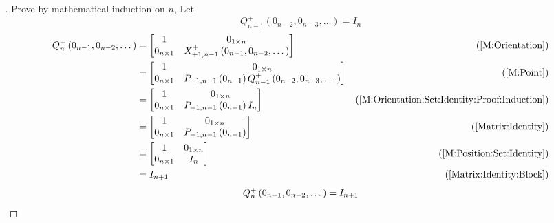 \documentclass[stu, babel, american, biblatex, a4paper, leqno, draftall]{apa7}
\begin{document}
\begin{proof}[]
    Prove by mathematical induction on $n$,
    Let 
    \begin{equation}\label{M:Orientation:Set:Identity:Proof:Induction}
        Q^+_{n-1}\left(0_{n-2}, 0_{n-3}, \dots\right)=I_n
    \end{equation}
	\begin{align*}
		Q^+_n\left(0_{n-1}, 0_{n-2}, \dots\right)
		&=
		\begin{bmatrix}
            1 & 0_{1\times n}                                                             \\
            0_{n\times 1} & X^\pm_{+1,n-1}\left(0_{n-1},0_{n-2},\dots\right) \\
        \end{bmatrix} & \text{(\cref{M:Orientation})} \\
        &=
		\begin{bmatrix}
            1 & 0_{1\times n}                                                             \\
            0_{n\times 1} & P_{+1,n-1}\left(0_{n-1}\right)Q^+_{n-1}\left(0_{n-2}, 0_{n-3}, \dots\right) \\
        \end{bmatrix} & \text{(\cref{M:Point})} \\
        &=
		\begin{bmatrix}
            1 & 0_{1\times n}                                                             \\
            0_{n\times 1} & P_{+1,n-1}\left(0_{n-1}\right) I_n \\
        \end{bmatrix} & \text{(\cref{M:Orientation:Set:Identity:Proof:Induction})} \\
        &=
		\begin{bmatrix}
            1 & 0_{1\times n}                                                             \\
            0_{n\times 1} & P_{+1,n-1}\left(0_{n-1}\right) \\
        \end{bmatrix} & \text{(\cref{Matrix:Identity})} \\
        &=
		\begin{bmatrix}
            1 & 0_{1\times n}                                                             \\
            0_{n\times 1} & I_{n} \\
        \end{bmatrix} & \text{(\cref{M:Position:Set:Identity})} \\
        &=
		I_{n+1} & \text{(\cref{Matrix:Identity:Block})}
	\end{align*}
    \begin{equation*}
    	Q^+_n
        \left(0_{n-1}, 0_{n-2}, \dots\right)
    	=
    	I_{n+1}
    	\qedhere
    \end{equation*}
\end{proof}
\end{document}
